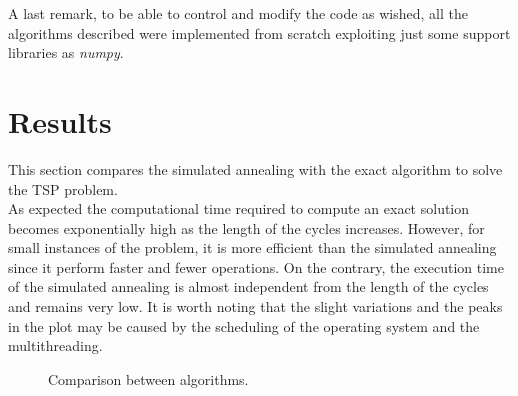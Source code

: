 \documentclass{article}
\begin{document}
\noindent A last remark, to be able to control and modify the code as wished, all the algorithms described were implemented from scratch exploiting just some support libraries as \textit{numpy}.

\section{Results}
This section compares the simulated annealing with the exact algorithm to solve the TSP problem. \\
As expected the computational time required to compute an exact solution becomes exponentially high as the length of the cycles increases. However, for small instances of the problem, it is more efficient than the simulated annealing since it perform faster and fewer operations. On the contrary, the execution time of the simulated annealing is almost independent from the length of the cycles and remains very low. It is worth noting that the slight variations and the peaks in the plot may be caused by the scheduling of the operating system and the multithreading.
\begin{figure}[H]
\begin{adjustwidth}{-4em}{-4em}

     \hfill
     
     \caption{Comparison between algorithms.}
    \end{adjustwidth}
   \end{figure}
 
\end{document}
